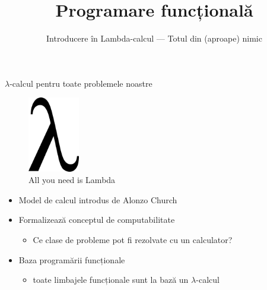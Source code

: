 \documentclass[xcolor=pdftex,romanian,colorlinks]{beamer}
\title[PF---$\lambda$ calcul]{Programare funcțional\u a}
\subtitle{Introducere în Lambda-calcul --- Totul din (aproape) nimic}
\date{}
\begin{document}
\frame{\titlepage}

\begin{frame}{\(\lambda\)-calcul pentru toate problemele noastre}
\protect\hypertarget{lambda-calcul-pentru-toate-problemele-noastre}{}

\begin{figure}
\centering
\includegraphics[width=0.2\textwidth]{lambda.png}
\caption{All you need is Lambda}
\end{figure}

\begin{itemize}

\item
  Model de calcul introdus de Alonzo Church
\item
  Formalizează conceptul de computabilitate

  \begin{itemize}
  
  \item
    Ce clase de probleme pot fi rezolvate cu un calculator?
  \end{itemize}
\item
  Baza programării funcționale

  \begin{itemize}
  
  \item
    toate limbajele funcționale sunt la bază un \(\lambda\)-calcul
  \end{itemize}
\end{itemize}

\end{frame}
\end{document}
